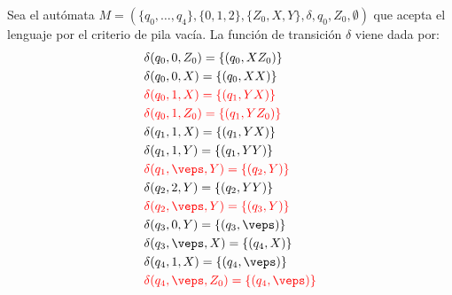 \begin{ejercicio}
\begin{enumerate}
        Sea el autómata $M = (\{q_0,\ldots,q_4\},\{0,1,2\},\{Z_0,X,Y\},\delta,q_0,Z_0,\emptyset)$ que acepta el lenguaje por el criterio de pila vacía. La función de transición $\delta$ viene dada por:
        \begin{align*}
            &\delta(q_0,0,Z_0) = \{(q_0,XZ_0)\} \\
            &\delta(q_0,0,X) = \{(q_0,XX)\} \\
            &\red{\delta(q_0,1,X) = \{(q_1,YX)\}} \\
            &\red{\delta(q_0,1,Z_0) = \{(q_1,YZ_0)\}} \\
            &\delta(q_1,1,X) = \{(q_1,YX)\} \\
            &\delta(q_1,1,Y) = \{(q_1,YY)\} \\
            &\red{\delta(q_1,\veps,Y) = \{(q_2,Y)\}} \\
            &\delta(q_2,2,Y) = \{(q_2,YY)\} \\
            &\red{\delta(q_2,\veps,Y) = \{(q_3,Y)\}} \\
            &\delta(q_3,0,Y) = \{(q_3,\veps)\} \\
            &\delta(q_3,\veps,X) = \{(q_4,X)\} \\
            &\delta(q_4,1,X) = \{(q_4,\veps)\} \\
            &\red{\delta(q_4,\veps,Z_0) = \{(q_4,\veps)\}}
        \end{align*}

    \end{enumerate}
\end{ejercicio}

